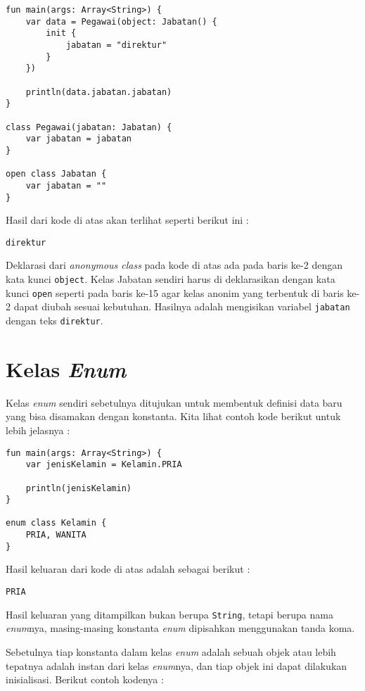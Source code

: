 \begin{lstlisting}
fun main(args: Array<String>) {
	var data = Pegawai(object: Jabatan() {
		init {
			jabatan = "direktur"
		}
	})
	
	println(data.jabatan.jabatan)
}

class Pegawai(jabatan: Jabatan) {
	var jabatan = jabatan
}

open class Jabatan {
	var jabatan = ""
}
\end{lstlisting}

Hasil dari kode di atas akan terlihat seperti berikut ini :

\begin{lstlisting}
direktur
\end{lstlisting}

Deklarasi dari \textit{anonymous class} pada kode di atas ada pada baris ke-2 dengan kata kunci \texttt{object}. Kelas Jabatan sendiri harus di deklarasikan dengan kata kunci \texttt{open} seperti pada baris ke-15 agar kelas anonim yang terbentuk di baris ke-2 dapat diubah sesuai kebutuhan. Hasilnya adalah mengisikan variabel \texttt{jabatan} dengan teks \texttt{direktur}.

\section{Kelas \textit{Enum}}

Kelas \textit{enum} sendiri sebetulnya ditujukan untuk membentuk definisi data baru yang bisa disamakan dengan konstanta. Kita lihat contoh kode berikut untuk lebih jelasnya :

\begin{lstlisting}
fun main(args: Array<String>) {
	var jenisKelamin = Kelamin.PRIA
	
	println(jenisKelamin)
}

enum class Kelamin {
	PRIA, WANITA
}
\end{lstlisting}

Hasil keluaran dari kode di atas adalah sebagai berikut :

\begin{lstlisting}
PRIA
\end{lstlisting}

Hasil keluaran yang ditampilkan bukan berupa \texttt{String}, tetapi berupa nama \textit{enum}nya, masing-masing konstanta \textit{enum} dipisahkan menggunakan tanda koma.

Sebetulnya tiap konstanta dalam kelas \textit{enum} adalah sebuah objek atau lebih tepatnya adalah instan dari kelas \textit{enum}nya, dan tiap objek ini dapat dilakukan inisialisasi. Berikut contoh kodenya :

